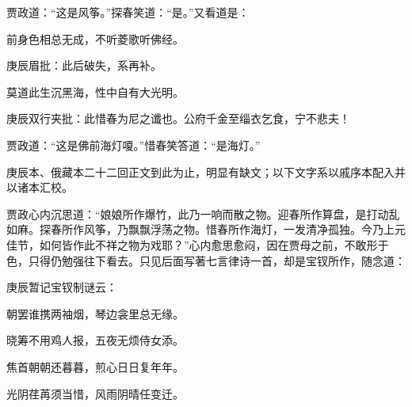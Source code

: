 \begin{parag}
    贾政道：“这是风筝。”探春笑道：“是。”又看道是：
\end{parag}
\begin{poem}

    \begin{pl}前身色相总无成，不听菱歌听佛经。\end{pl}\begin{note}庚辰眉批：此后破失，系再补。\end{note}

    \begin{pl}莫道此生沉黑海，性中自有大光明。\end{pl}\begin{note}庚辰双行夹批：此惜春为尼之谶也。公府千金至缁衣乞食，宁不悲夫！ \end{note}
\end{poem}

\begin{parag}
    贾政道：“这是佛前海灯嗄。”惜春笑答道：“是海灯。”
\end{parag}

\begin{note}
    庚辰本、俄藏本二十二回正文到此为止，明显有缺文；以下文字系以戚序本配入并以诸本汇校。
\end{note}

\begin{parag}
    贾政心内沉思道：“娘娘所作爆竹，此乃一响而散之物。迎春所作算盘，是打动乱如麻。探春所作风筝，乃飘飘浮荡之物。惜春所作海灯，一发清净孤独。今乃上元佳节，如何皆作此不祥之物为戏耶？”心内愈思愈闷，因在贾母之前，不敢形于色，只得仍勉强往下看去。只见后面写著七言律诗一首，却是宝钗所作，随念道：
\end{parag}


\begin{poem}
    \begin{note} 庚辰暂记宝钗制谜云：\end{note}

    \begin{pl} 朝罢谁携两袖烟，琴边衾里总无缘。\end{pl}

    \begin{pl} 晓筹不用鸡人报，五夜无烦侍女添。\end{pl}

    \begin{pl} 焦首朝朝还暮暮，煎心日日复年年。\end{pl}

    \begin{pl} 光阴荏苒须当惜，风雨阴晴任变迁。\end{pl}
\end{poem}

